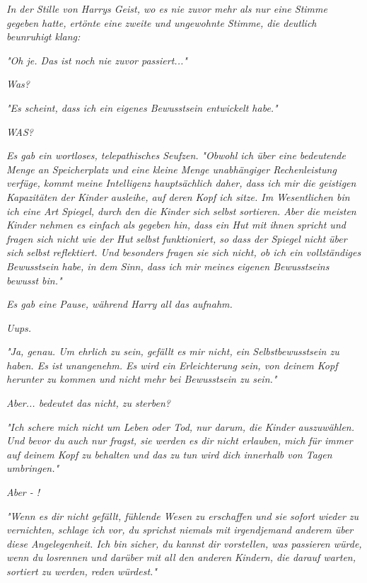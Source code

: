 {\emph{In der Stille von Harrys Geist, wo es nie zuvor mehr als nur eine Stimme gegeben hatte, ertönte eine zweite und ungewohnte Stimme, die deutlich beunruhigt klang:}

\emph{\emph{"Oh je. Das ist noch nie zuvor passiert..."}}

\emph{Was?}

\emph{"Es scheint, dass ich ein eigenes Bewusstsein entwickelt habe."}

\emph{WAS?}

\emph{Es gab ein wortloses, telepathisches Seufzen.} \emph{\emph{"Obwohl ich über eine bedeutende Menge an Speicherplatz und eine kleine Menge unabhängiger Rechenleistung verfüge, kommt meine Intelligenz hauptsächlich daher, dass ich mir die geistigen Kapazitäten der Kinder ausleihe, auf deren Kopf ich sitze. Im Wesentlichen bin ich eine Art Spiegel, durch den die Kinder sich}} \emph{selbst} \emph{\emph{sortieren. Aber die meisten Kinder nehmen es einfach als gegeben hin, dass ein Hut mit ihnen spricht und fragen sich nicht wie der Hut}} \emph{selbst} \emph{\emph{funktioniert, so dass der Spiegel nicht}} \emph{\emph{über sich}} \emph{selbst} \emph{\emph{reflektiert}\emph{. Und}} \emph{besonders} \emph{\emph{fragen sie sich nicht, ob ich ein vollständiges Bewusstsein habe, in dem Sinn, dass ich mir meines eigenen Bewusstseins bewusst bin."}}

\emph{Es gab eine Pause, während Harry all das aufnahm.}

\emph{\emph{Uups.}}

\emph{"Ja, genau. Um ehrlich zu sein, gefällt es mir nicht, ein Selbstbewusstsein zu haben. Es ist unangenehm. Es wird ein Erleichterung sein, von deinem Kopf herunter zu kommen und nicht mehr bei Bewusstsein zu sein."}

\emph{Aber... bedeutet das nicht, zu sterben?}

\emph{"Ich schere mich nicht um Leben oder Tod, nur darum, die Kinder auszuwählen. Und bevor du auch nur fragst, sie werden es dir nicht erlauben, mich für immer auf deinem Kopf zu behalten und das zu tun wird dich innerhalb von Tagen umbringen."}

\emph{Aber - !}

\emph{"Wenn es dir nicht gefällt, fühlende Wesen zu erschaffen und sie sofort wieder zu vernichten, schlage ich vor, du sprichst niemals mit irgendjemand anderem über diese Angelegenheit. Ich bin sicher, du kannst dir vorstellen, was passieren würde, wenn du losrennen und darüber mit all den anderen Kindern, die darauf warten, sortiert zu werden, reden würdest."}

}
